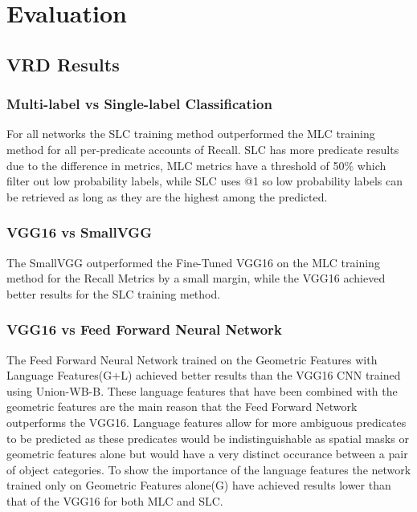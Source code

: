 \documentclass{IEEEtran}
\begin{document}
\section{Evaluation}
\subsection{VRD Results}
\subsubsection{Multi-label vs Single-label Classification}
For all networks the SLC training method outperformed the MLC training method for all per-predicate accounts of Recall. SLC has more predicate results due to the difference in metrics, MLC metrics have a threshold of 50\% which filter out low probability labels, while SLC uses @1 so low probability labels can be retrieved as long as they are the highest among the predicted.

\subsubsection{VGG16 vs SmallVGG}
The SmallVGG outperformed the Fine-Tuned VGG16 on the MLC training method for the Recall Metrics by a small margin, while the VGG16 achieved better results for the SLC training method.

\subsubsection{VGG16 vs Feed Forward Neural Network}
The Feed Forward Neural Network trained on the Geometric Features with Language Features(G+L) achieved better results than the VGG16 CNN trained using Union-WB-B. These language features that have been combined with the geometric features are the main reason that the Feed Forward Network outperforms the VGG16. Language features allow for more ambiguous predicates to be predicted as these predicates would be indistinguishable as spatial masks or geometric features alone but would have a very distinct occurance between a pair of object categories. To show the importance of the language features the network trained only on Geometric Features alone(G) have achieved results lower than that of the VGG16 for both MLC and SLC.
\end{document}
